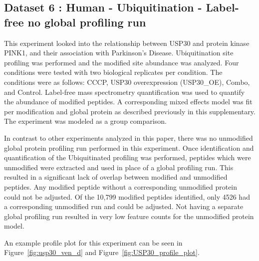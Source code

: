 \documentclass{mcp}
\def\sfigref#1{{Figure~\ref{#1}}}
\begin{document}
\clearpage

\subsection{Dataset 6 : Human - Ubiquitination - Label-free no global profiling run}
\label{sec:usp30}

This experiment looked into the relationship between USP30 and protein kinase PINK1, and their association with Parkinson's Disease. Ubiquitination site profiling was performed and the modified site abundance was analyzed. Four conditions were tested with two biological replicates per condition. The conditions were as follows: CCCP, USP30 overexpression (USP30\_OE), Combo, and Control. Label-free mass spectrometry quantification was used to quantify the abundance of modified peptides. A corresponding mixed effects model was fit per modification and global protein as described previously in this supplementary. The experiment was modeled as a group comparison.

In contrast to other experiments analyzed in this paper, there was no unmodified global protein profiling run performed in this experiment. Once identification and quantification of the Ubiquitinated profiling was performed, peptides which were unmodified were extracted and used in place of a global profiling run. This resulted in a significant lack of overlap between modified and unmodified peptides. Any modified peptide without a corresponding unmodified protein could not be adjusted. Of the 10,799 modified peptides identified, only 4526 had a corresponding unmodified run and could be adjusted. Not having a separate global profiling run resulted in very low feature counts for the unmodified protein model.

An example profile plot for this experiment can be seen in \sfigref{fig:usp30_ven_d} and \sfigref{fig:USP30_profile_plot}.
\end{document}
